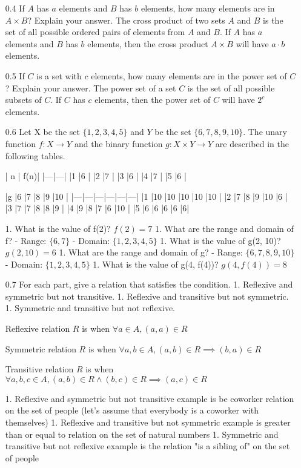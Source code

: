 \documentclass[12pt, a4paper]{article}
\begin{document}
\begin{enumerate}
    \item[0.4]
If $A$ has  $a$  elements and  $B$  has  $b$  elements, how many elements are in  $A \times B$? 
Explain your answer.
The cross product of two sets $A$ and $B$ is the set of all possible ordered pairs of elements from $A$ and $B$. If $A$ has $a$ elements and $B$ has $b$ elements, then the cross product $A \times B$ will have $a \cdot b$ elements.

    \item[0.5]
If $C$ is a set with $c$ elements, how many elements are in the power set of $C$? 
Explain your answer.
The power set of a set $C$ is the set of all possible subsets of $C$. If $C$ has $c$ elements, then the power set of $C$ will have $2^c$ elements.

    \item[0.6]
Let X be the set $\{1, 2, 3, 4, 5\}$ and $Y$ be the set $\{6, 7, 8, 9, 10\}$. The unary function $f: X \to Y$ and the binary function $g: X \times Y \to Y$ are described in the following tables.

| n | f(n)| 
|---|---|
|1 |6 |
|2 |7 |
|3 |6 |
|4 |7 |
|5 |6 |

|g |6 |7 |8 |9 |10 |
|---|---|---|---|---|---|
|1 |10 |10 |10 |10 |10 |
|2 |7 |8 |9 |10 |6 |
|3 |7 |7 |8 |8 |9 |
|4 |9 |8 |7 |6 |10 |
|5 |6 |6 |6 |6 |6|

1. What is the value of f(2)? 
    $f(2) = 7$
1. What are the range and domain of f?
    - Range: $\{6, 7\}$
    - Domain: $\{1, 2, 3, 4, 5\}$
1. What is the value of g(2, 10)?
    $g(2, 10) = 6$
1. What are the range and domain of g?
    - Range: $\{6, 7, 8, 9, 10\}$
    - Domain: $\{1, 2, 3, 4, 5\}$
1. What is the value of g(4, f(4))?
    $g(4, f(4)) = 8$

    \item[0.7]
For each part, give a relation that satisfies the condition.
1. Reflexive and symmetric but not transitive.
1. Reflexive and transitive but not symmetric.
1. Symmetric and transitive but not reflexive.

Reflexive relation $R$ is when $\forall a \in A, (a, a) \in R$

Symmetric relation $R$ is when $\forall a, b \in A, (a, b) \in R \implies (b, a) \in R$

Transitive relation $R$ is when $\forall a, b, c \in A, (a, b) \in R \land (b, c) \in R \implies (a, c) \in R$

1. Reflexive and symmetric but not transitive example is be coworker relation on the set of people (let's assume that everybody is a coworker with themselves)
1. Reflexive and transitive but not symmetric example is greater than or equal to relation on the set of natural numbers
1. Symmetric and transitive but not reflexive example is the relation "is a sibling of" on the set of people


\end{enumerate}
\end{document}
